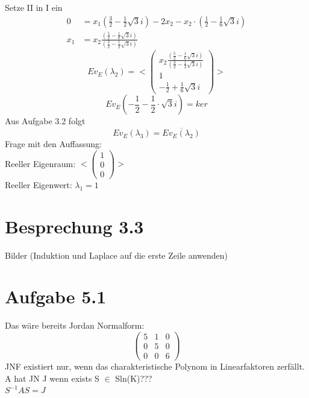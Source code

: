 \documentclass{article} %
\begin{document}
Setze II in I ein
\begin{align*}
   0 & =  x_1 (\frac{3}{2}-\frac{1}{2}\sqrt{3}i) -2x_2 - x_2 \cdot (\frac{1}{2} - \frac{1}{6}\sqrt{3}i) \\
   x_1 & = x_2 \frac{(\frac{5}{2}- \frac{1}{6} \sqrt{3}i)}{(\frac{3}{2}-\frac{1}{2}\sqrt{3}i)} 
\end{align*}
\[
E v_E (\lambda_2) = <
\begin{pmatrix}
x_2 \frac{(\frac{5}{2}- \frac{1}{6} \sqrt{3}i)}{(\frac{3}{2}-\frac{1}{2}\sqrt{3}i)} \\ 1 \\ -\frac{1}{2} + \frac{1}{6}\sqrt{3}i
\end{pmatrix}>
\]
\[
E v_E ( -\frac{1}{2} - \frac{1}{2} \cdot \sqrt{3}i) = ker
\]
Aus Aufgabe 3.2 folgt 
\[
E v_E (\lambda_3) = \overline{E v_E(\lambda_2)}
\]
Frage mit den Auffassung: \\
Reeller Eigenraum: $ < \begin{pmatrix} 1 \\ 0 \\ 0 \end{pmatrix} >$ \\
Reeller Eigenwert: $\lambda_1 = 1$
\section*{Besprechung 3.3}
Bilder (Induktion und Laplace auf die erste Zeile anwenden) 
\section{Aufgabe 5.1}
Das wäre bereits Jordan Normalform: 
\[
\begin{pmatrix}
5 & 1 & 0 \\
0 & 5 & 0 \\
0 & 0 & 6
\end{pmatrix}
\]
JNF existiert nur, wenn das charakteristische Polynom in Linearfaktoren zerfällt. A hat JN  J wenn exists S $\in$ Sln(K)???  \\
$S^{-1} A S = J $
\end{document}
